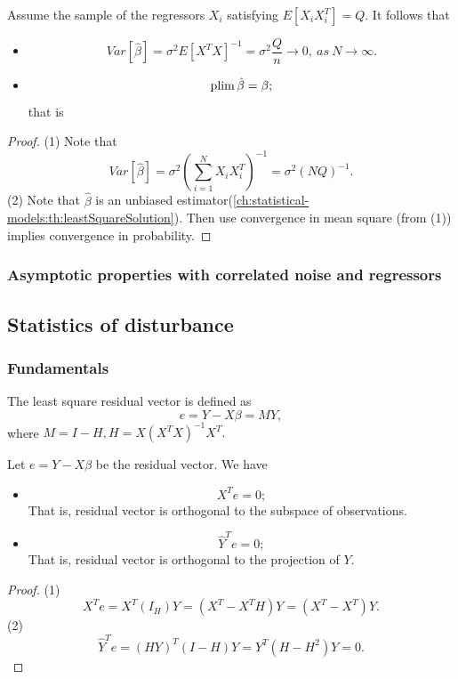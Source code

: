 \begin{refsection}
\begin{lemma}[]
Assume the sample of the regressors $X_i$ satisfying $E[X_iX_i^T] = Q$. It follows that  
\begin{itemize}
	\item 
	$$Var[\hat{\beta}] = \sigma^2 E[X^TX]^{-1} = \sigma^2 \frac{Q}{n} \to 0, ~as~N\to \infty.$$
	\item $$\operatorname*{plim} \hat{\beta} = \beta;$$
	that is
\end{itemize}
\end{lemma}
\begin{proof}
(1)
Note that
$$Var[\hat{\beta}] = \sigma^2 (\sum_{i=1}^N X_iX_i^T)^{-1} = \sigma^2(NQ)^{-1}.$$
(2) Note that $\hat{\beta}$ is an unbiased estimator(\autoref{ch:statistical-models:th:leastSquareSolution}). Then use convergence in mean square (from (1)) implies convergence in probability.	
\end{proof}


\subsubsection{Asymptotic properties with correlated noise and regressors }



\subsection{Statistics of disturbance}
\subsubsection{Fundamentals}
\begin{definition}\cite[194]{theil1971principles}
The least square residual vector is defined as
$$e = Y - X\beta = MY,$$
where $M = I-H, H = X(X^TX)^{-1}X^T.$	
\end{definition}

\begin{lemma}
Let $e = Y-X\beta$ be the residual vector. 
We have
\begin{itemize}
	\item $$X^Te = 0;$$
	That is, residual vector is orthogonal to the subspace of observations.
	\item $$\hat{Y}^Te = 0;$$
	That is, residual vector is orthogonal to the projection of $Y$.
\end{itemize}	
\end{lemma}
\begin{proof}
(1)	
$$X^Te = X^T(I_H)Y = (X^T - X^TH)Y = (X^T - X^T)Y.$$
(2)
$$\hat{Y}^Te  = (HY)^T(I-H)Y = Y^T(H-H^2)Y = 0.$$
\end{proof}





\end{refsection}
